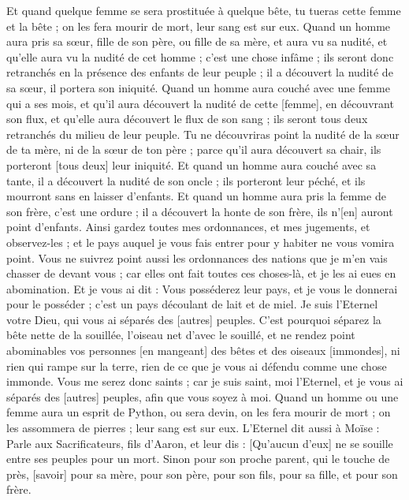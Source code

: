 \begin{multicols}{2}
Et quand quelque femme se sera prostituée à quelque bête, tu tueras cette femme et la bête ; on les fera mourir de mort, leur sang est sur eux.
Quand un homme aura pris sa sœur, fille de son père, ou fille de sa mère, et aura vu sa nudité, et qu'elle aura vu la nudité de cet homme ; c'est une chose infâme ; ils seront donc retranchés en la présence des enfants de leur peuple ; il a découvert la nudité de sa sœur, il portera son iniquité.
Quand un homme aura couché avec une femme qui a ses mois, et qu'il aura découvert la nudité de cette [femme], en découvrant son flux, et qu'elle aura découvert le flux de son sang ; ils seront tous deux retranchés du milieu de leur peuple.
Tu ne découvriras point la nudité de la sœur de ta mère, ni de la sœur de ton père ; parce qu'il aura découvert sa chair, ils porteront [tous deux] leur iniquité.
Et quand un homme aura couché avec sa tante, il a découvert la nudité de son oncle ; ils porteront leur péché, et ils mourront sans en laisser d'enfants.
Et quand un homme aura pris la femme de son frère, c'est une ordure ; il a découvert la honte de son frère, ils n'[en] auront point d'enfants.
Ainsi gardez toutes mes ordonnances, et mes jugements, et observez-les ; et le pays auquel je vous fais entrer pour y habiter ne vous vomira point.
Vous ne suivrez point aussi les ordonnances des nations que je m'en vais chasser de devant vous ; car elles ont fait toutes ces choses-là, et je les ai eues en abomination.
Et je vous ai dit : Vous posséderez leur pays, et je vous le donnerai pour le posséder ; c'est un pays découlant de lait et de miel. Je suis l'Eternel votre Dieu, qui vous ai séparés des [autres] peuples.
C'est pourquoi séparez la bête nette de la souillée, l'oiseau net d'avec le souillé, et ne rendez point abominables vos personnes [en mangeant] des bêtes et des oiseaux [immondes], ni rien qui rampe sur la terre, rien de ce que je vous ai défendu comme une chose immonde.
Vous me serez donc saints ; car je suis saint, moi l'Eternel, et je vous ai séparés des [autres] peuples, afin que vous soyez à moi.
Quand un homme ou une femme aura un esprit de Python, ou sera devin, on les fera mourir de mort ; on les assommera de pierres ; leur sang est sur eux.
\VerseOne{}L'Eternel dit aussi à Moïse : Parle aux Sacrificateurs, fils d'Aaron, et leur dis : [Qu'aucun d'eux] ne se souille entre ses peuples pour un mort.
Sinon pour son proche parent, qui le touche de près, [savoir] pour sa mère, pour son père, pour son fils, pour sa fille, et pour son frère.

\end{multicols}
